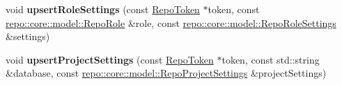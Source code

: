\begin{DoxyCompactItemize}
\item 
\hypertarget{classrepo_1_1_repo_controller_a4669d02b62c628a2096f1fd98d575564}{}void {\bfseries upsert\+Role\+Settings} (const \hyperlink{class_repo_controller_1_1_repo_token}{Repo\+Token} $\ast$token, const \hyperlink{classrepo_1_1core_1_1model_1_1_repo_role}{repo\+::core\+::model\+::\+Repo\+Role} \&role, const \hyperlink{classrepo_1_1core_1_1model_1_1_repo_role_settings}{repo\+::core\+::model\+::\+Repo\+Role\+Settings} \&settings)\label{classrepo_1_1_repo_controller_a4669d02b62c628a2096f1fd98d575564}

\item 
\hypertarget{classrepo_1_1_repo_controller_a773df3c01f6fe7f7643789b44c674369}{}void {\bfseries upsert\+Project\+Settings} (const \hyperlink{class_repo_controller_1_1_repo_token}{Repo\+Token} $\ast$token, const std\+::string \&database, const \hyperlink{classrepo_1_1core_1_1model_1_1_repo_project_settings}{repo\+::core\+::model\+::\+Repo\+Project\+Settings} \&project\+Settings)\label{classrepo_1_1_repo_controller_a773df3c01f6fe7f7643789b44c674369}


\end{DoxyCompactItemize}
